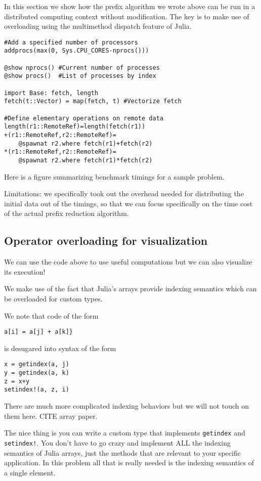 \documentclass{sig-alternate}
\newcommand{\code}[1]{\texttt{#1}}
\begin{document}
In this section we show how the prefix algorithm we wrote above can be run in a distributed computing context without modification. The key is to make use of overloading using the multimethod dispatch feature of Julia.

\begin{verbatim}
#Add a specified number of processors
addprocs(max(0, Sys.CPU_CORES-nprocs()))

@show nprocs() #Current number of processes
@show procs()  #List of processes by index

import Base: fetch, length
fetch(t::Vector) = map(fetch, t) #Vectorize fetch

#Define elementary operations on remote data
length(r1::RemoteRef)=length(fetch(r1))
+(r1::RemoteRef,r2::RemoteRef)=
    @spawnat r2.where fetch(r1)+fetch(r2)
*(r1::RemoteRef,r2::RemoteRef)=
    @spawnat r2.where fetch(r1)*fetch(r2)
\end{verbatim}

Here is a figure summarizing benchmark timings for a sample problem.

Limitations: we specifically took out the overhead needed for distributing the initial data out of the timings, so that we can focus specifically on the time cost of the actual prefix reduction algorithm.

\subsection{Operator overloading for visualization}

We can use the code above to use useful computations but we can also visualize its execution!

We make use of the fact that Julia's arrays provide indexing semantics which can be overloaded for custom types.

We note that code of the form

\begin{verbatim}
a[i] = a[j] + a[k]}
\end{verbatim}
is desugared into syntax of the form

\begin{verbatim}
x = getindex(a, j)
y = getindex(a, k)
z = x+y
setindex!(a, z, i)
\end{verbatim}

There are much more complicated indexing behaviors but we will not touch on them here. CITE array paper.

The nice thing is you can write a custom type that implements \code{getindex} and \code{setindex!}. You don't have to go crazy and implement ALL the indexing semantics of Julia arrays, just the methods that are relevant to your specific application. In this problem all that is really needed is the indexing semantics of a single element.
\end{document}
